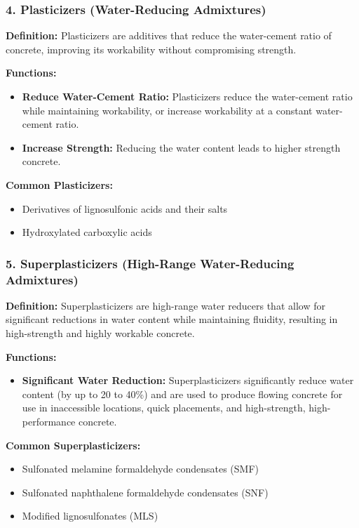 \documentclass[a4paper,11pt]{book}
\begin{document}
\subsubsection*{4. Plasticizers (Water-Reducing Admixtures)}
\textbf{Definition:} Plasticizers are additives that reduce the water-cement ratio of concrete, improving its workability without compromising strength.

\textbf{Functions:}
\begin{itemize}
    \item \textbf{Reduce Water-Cement Ratio:} Plasticizers reduce the water-cement ratio while maintaining workability, or increase workability at a constant water-cement ratio.
    \item \textbf{Increase Strength:} Reducing the water content leads to higher strength concrete.
\end{itemize}

\textbf{Common Plasticizers:}
\begin{itemize}
    \item Derivatives of lignosulfonic acids and their salts
    \item Hydroxylated carboxylic acids
\end{itemize}

\subsubsection*{5. Superplasticizers (High-Range Water-Reducing Admixtures)}
\textbf{Definition:} Superplasticizers are high-range water reducers that allow for significant reductions in water content while maintaining fluidity, resulting in high-strength and highly workable concrete.

\textbf{Functions:}
\begin{itemize}
    \item \textbf{Significant Water Reduction:} Superplasticizers significantly reduce water content (by up to 20 to 40\%) and are used to produce flowing concrete for use in inaccessible locations, quick placements, and high-strength, high-performance concrete.
\end{itemize}

\textbf{Common Superplasticizers:}
\begin{itemize}
    \item Sulfonated melamine formaldehyde condensates (SMF)
    \item Sulfonated naphthalene formaldehyde condensates (SNF)
    \item Modified lignosulfonates (MLS)
\end{itemize}
\end{document}

